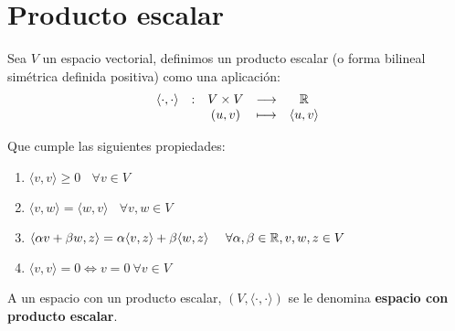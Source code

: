 \section{Producto escalar}
\begin{definicion}
    Sea $V$ un espacio vectorial, definimos un producto escalar (o forma bilineal simétrica definida positiva)
    como una aplicación:
    $$\begin{array}{ccccc}
            \langle\cdot,\cdot\rangle & : & V \times V & \longrightarrow & \mathbb R                  \\
                                      &   & (u,v)      & \longmapsto     & \langle u,v \rangle
        \end{array}$$

    \noindent
    Que cumple las siguientes propiedades:
    \begin{enumerate}
        \item $\langle v,v\rangle \geq 0~~~~\forall v \in V$
        \item $\langle v,w\rangle = \langle w,v\rangle~~~~\forall v,w \in V$
        \item $\langle \alpha v + \beta w, z\rangle = \alpha \langle v,z\rangle + \beta \langle w,z \rangle~~~~\forall \alpha, \beta \in \mathbb R, v,w,z \in V$
        \item $\langle v,v\rangle = 0 \Leftrightarrow v=0 \  \forall v \in V$
    \end{enumerate}

    \noindent
    A un espacio con un producto escalar, $(V, \langle\cdot,\cdot\rangle)$ se le denomina \textbf{espacio con producto escalar}.
\end{definicion}


